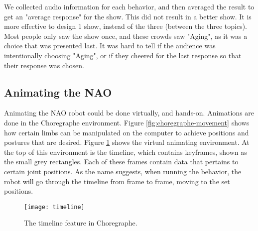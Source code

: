         We collected audio information for each behavior, and then averaged the result to get an "average response" for the show.
        This did not result in a better show. It is more effective to design 1 show, instead of the three (between the three topics).
        Most people only saw the show once, and these crowds saw "Aging", as it was a choice that was presented last.
        It was hard to tell if the audience was intentionally choosing "Aging", or if they cheered for the last response so that their response was chosen.

\subsection{Animating the NAO}
Animating the NAO robot could be done virtually, and hands-on.
Animations are done in the Choregraphe environment. Figure \ref{fig:choregraphe-movement} shows how certain limbs can be manipulated on the computer to achieve positions and postures that are desired. Figure \ref{fig:timeline} shows the virtual animating environment. At the top of this environment is the timeline, which contains keyframes, shown as the small grey rectangles. Each of these frames contain data that pertains to certain joint positions. As the name suggests, when running the behavior, the robot will go through the timeline from frame to frame, moving to the set positions.

\begin{figure}[H]
  \centering
  \texttt{[image: timeline]}
  \caption{The timeline feature in Choregraphe.}
	\label{fig:timeline}
\end{figure}

